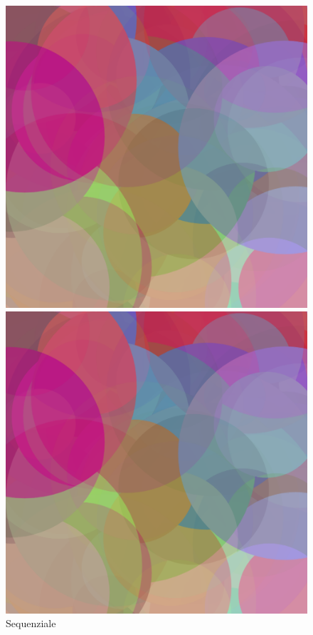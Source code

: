 \documentclass[11pt]{article}
\begin{document}
    \begin{figure}
        \begin{minipage}{0.32\textwidth}
            \centering
            \includegraphics[width=\textwidth]{img/seq/10000}
            \caption{Sequenziale}
        \end{minipage}%
        \hfill
        \begin{minipage}{0.32\textwidth}
            \centering
            \includegraphics[width=\textwidth]{img/par/10000}

\end{minipage}
\end{figure}
\end{document}
